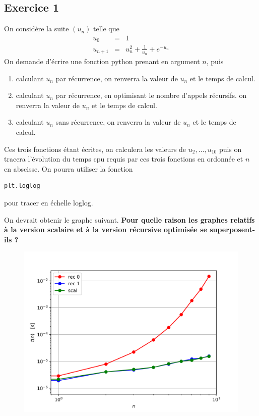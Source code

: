 \documentclass[a4paper,12pt]{article}
\begin{document}
\subsection{Exercice 1}
\begin{leftbar}
On consid\`ere la suite $(u_n)$ telle que 
\begin{eqnarray*}
u_0&=&1\\
u_{n+1}&=&u_n^2+\frac{1}{u_n}+e^{-u_n}
\end{eqnarray*}
On demande d'\'ecrire une fonction python prenant en argument $n$, puis 
\begin{enumerate}
\item calculant $u_n$ par r\'ecurrence, on renverra la valeur de $u_n$ et le temps de calcul.
\item calculant $u_n$ par r\'ecurrence, en optimisant le nombre d'appels r\'ecursifs. on renverra la valeur de $u_n$ et le temps de calcul.
\item calculant $u_n$ sans r\'ecurrence,  on renverra la valeur de $u_n$ et le temps de calcul.
\end{enumerate}
Ces trois fonctions \'etant \'ecrites, on calculera les valeurs de $u_2,\ldots,u_{10}$ puis on tracera l'\'evolution du temps cpu requis par ces trois fonctions en ordonn\'ee et $n$ en abscisse. On pourra utiliser la fonction 
\begin{verbatim}
plt.loglog
\end{verbatim} 
pour tracer en \'echelle loglog. 

On devrait obtenir le graphe suivant. 
\textbf{Pour quelle raison les graphes relatifs \`a la version scalaire et \`a la version r\'ecursive optimis\'ee se superposent-ils ?}
\end{leftbar}
\begin{figure}[htbp]
\includegraphics[width=16cm]{./2023/exo1.png}
\end{figure}
\end{document}
